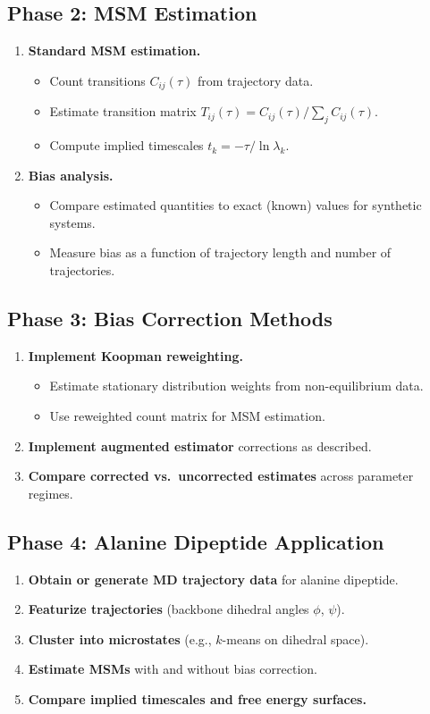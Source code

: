 \documentclass[11pt,a4paper]{article}
\begin{document}
\subsection{Phase 2: MSM Estimation}
\begin{enumerate}[label=\textbf{2.\arabic*}]
  \item \textbf{Standard MSM estimation.}
    \begin{itemize}
      \item Count transitions $C_{ij}(\tau)$ from trajectory data.
      \item Estimate transition matrix $T_{ij}(\tau) = C_{ij}(\tau) / \sum_j C_{ij}(\tau)$.
      \item Compute implied timescales $t_k = -\tau / \ln \lambda_k$.
    \end{itemize}
  \item \textbf{Bias analysis.}
    \begin{itemize}
      \item Compare estimated quantities to exact (known) values for synthetic systems.
      \item Measure bias as a function of trajectory length and number of trajectories.
    \end{itemize}
\end{enumerate}

\subsection{Phase 3: Bias Correction Methods}
\begin{enumerate}[label=\textbf{3.\arabic*}]
  \item \textbf{Implement Koopman reweighting.}
    \begin{itemize}
      \item Estimate stationary distribution weights from non-equilibrium data.
      \item Use reweighted count matrix for MSM estimation.
    \end{itemize}
  \item \textbf{Implement augmented estimator} corrections as described.
  \item \textbf{Compare corrected vs.\ uncorrected estimates} across parameter regimes.
\end{enumerate}

\subsection{Phase 4: Alanine Dipeptide Application}
\begin{enumerate}[label=\textbf{4.\arabic*}]
  \item \textbf{Obtain or generate MD trajectory data} for alanine dipeptide.
  \item \textbf{Featurize trajectories} (backbone dihedral angles $\phi$, $\psi$).
  \item \textbf{Cluster into microstates} (e.g., $k$-means on dihedral space).
  \item \textbf{Estimate MSMs} with and without bias correction.
  \item \textbf{Compare implied timescales and free energy surfaces.}
\end{enumerate}
\end{document}
